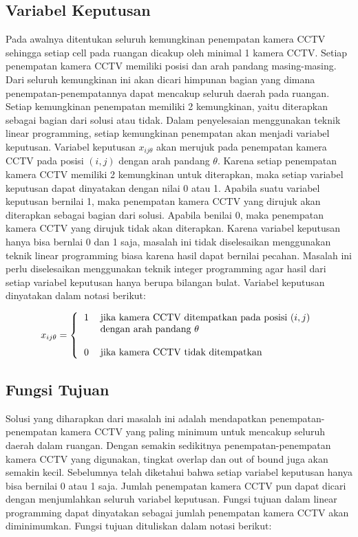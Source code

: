 \subsection{Variabel Keputusan}
Pada awalnya ditentukan seluruh kemungkinan penempatan kamera CCTV sehingga setiap cell pada ruangan dicakup oleh minimal 1 kamera CCTV. Setiap penempatan kamera CCTV memiliki posisi dan arah pandang masing-masing. Dari seluruh kemungkinan ini akan dicari himpunan bagian yang dimana penempatan-penempatannya dapat mencakup seluruh daerah pada ruangan. Setiap kemungkinan penempatan memiliki 2 kemungkinan, yaitu diterapkan sebagai bagian dari solusi atau tidak. Dalam penyelesaian menggunakan teknik linear programming, setiap kemungkinan penempatan akan menjadi variabel keputusan. Variabel keputusan \(x_{ij\theta}\) akan merujuk pada penempatan kamera CCTV pada posisi \((i,j)\) dengan arah pandang \(\theta\). Karena setiap penempatan kamera CCTV memiliki 2 kemungkinan untuk diterapkan, maka setiap variabel keputusan dapat dinyatakan dengan nilai 0 atau 1. Apabila suatu variabel keputusan bernilai 1, maka penempatan kamera CCTV yang dirujuk akan diterapkan sebagai bagian dari solusi. Apabila benilai 0, maka penempatan kamera CCTV yang dirujuk tidak akan diterapkan. Karena variabel keputusan hanya bisa bernlai 0 dan 1 saja, masalah ini tidak diselesaikan menggunakan teknik linear programming biasa karena hasil dapat bernilai pecahan. Masalah ini perlu diselesaikan menggunakan teknik integer programming agar hasil dari setiap variabel keputusan hanya berupa bilangan bulat. Variabel keputusan dinyatakan dalam notasi berikut:

\begin{equation*}
	x_{ij\theta} =
	\left \{
  		\begin{tabular}{cl}
  			1 & jika kamera CCTV ditempatkan pada posisi $(i,j)$\\
  			  & dengan arah pandang $\theta$\\
  			  &  \\
  			0 & jika kamera CCTV tidak ditempatkan
  		\end{tabular}
  	\right.
\end{equation*}

\subsection{Fungsi Tujuan}
Solusi yang diharapkan dari masalah ini adalah mendapatkan penempatan-penempatan kamera CCTV yang paling minimum untuk mencakup seluruh daerah dalam ruangan. Dengan semakin sedikitnya penempatan-penempatan kamera CCTV yang digunakan, tingkat overlap dan out of bound juga akan semakin kecil. Sebelumnya telah diketahui bahwa setiap variabel keputusan hanya bisa bernilai 0 atau 1 saja. Jumlah penempatan kamera CCTV pun dapat dicari dengan menjumlahkan seluruh variabel keputusan. Fungsi tujuan dalam linear programming dapat dinyatakan sebagai jumlah penempatan kamera CCTV akan diminimumkan. Fungsi tujuan dituliskan dalam notasi berikut:

